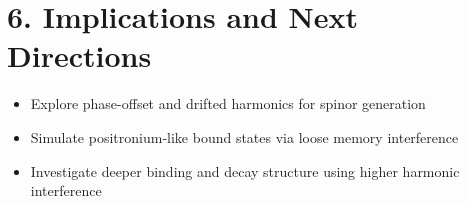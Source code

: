 \documentclass[12pt]{article}
\begin{document}
\section*{6. Implications and Next Directions}
\begin{itemize}
  \item Explore phase-offset and drifted harmonics for spinor generation
  \item Simulate positronium-like bound states via loose memory interference
  \item Investigate deeper binding and decay structure using higher harmonic interference
\end{itemize}
\end{document}
